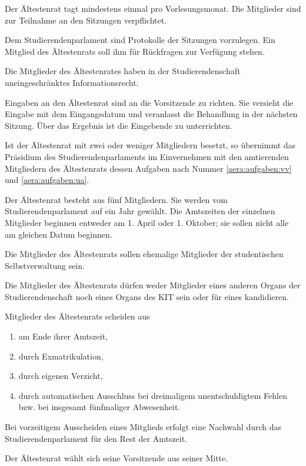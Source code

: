 \begin{jurdoc}
Der Ältestenrat tagt mindestens einmal pro Vorlesungsmonat. Die Mitglieder sind zur Teilnahme an den Sitzungen verpflichtet.

Dem Studierendenparlament sind Protokolle der Sitzungen vorzulegen. Ein Mitglied des Ältestenrats soll ihm für Rückfragen zur Verfügung stehen.

Die Mitglieder des Ältestenrates haben in der Studierendenschaft uneingeschränktes Informationsrecht.

Eingaben an den Ältestenrat sind an die Vorsitzende zu richten. Sie versieht die Eingabe mit dem Eingangsdatum und veranlasst die Behandlung in der nächsten Sitzung. Über das Ergebnis ist die Eingebende zu unterrichten.

Ist der Ältestenrat mit zwei oder weniger Mitgliedern besetzt, so übernimmt das Präsidium des Studierendenparlaments im Einvernehmen mit den amtierenden Mitgliedern des Ältestenrats dessen Aufgaben nach  Nummer \ref{aera:aufgaben:vv} und \ref{aera:aufgaben:ua}.



Der Ältestenrat besteht aus fünf Mitgliedern. Sie werden vom Studierendenparlament auf ein Jahr gewählt. Die Amtszeiten der einzelnen Mitglieder beginnen entweder am 1. April oder 1. Oktober; sie sollen nicht alle am gleichen Datum beginnen.

Die Mitglieder des Ältestenrats sollen ehemalige Mitglieder der studentischen Selbstverwaltung sein.

Die Mitglieder des Ältestenrats dürfen weder Mitglieder eines anderen Organs der Studierendenschaft noch eines Organs des KIT sein oder für eines kandidieren.

Mitglieder des Ältestenrats scheiden aus
  \begin{enumerate}
  \item am Ende ihrer Amtszeit,
  \item durch Exmatrikulation,
  \item durch eigenen Verzicht,
  \item durch automatischen Ausschluss bei dreimaligem unentschuldigtem Fehlen bzw. bei insgesamt fünfmaliger Abwesenheit.
  \end{enumerate}
Bei vorzeitigem Ausscheiden eines Mitglieds erfolgt eine Nachwahl durch das Studierendenparlament für den Rest der Amtszeit.



Der Ältestenrat wählt sich seine Vorsitzende aus seiner Mitte.


\end{jurdoc}
